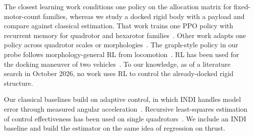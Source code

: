 \documentclass[conference]{IEEEtran}
\begin{document}
The closest learning work conditions one policy on the allocation matrix for fixed-motor-count families, whereas we study a docked rigid body with a payload and compare against classical estimation.
That work trains one PPO policy with recurrent memory for quadrotor and hexarotor families~\cite{konstantaropoulos2026embodiment}.
Other work adapts one policy across quadrotor scales or morphologies~\cite{vaidya2025dynamics,eschmann2025raptor,rehberg2026efficient}.
The graph-style policy in our probe follows morphology-general RL from locomotion~\cite{huang2020one,engwegen2025shared,luo2025gcnt}.
RL has been used for the docking maneuver of two vehicles~\cite{feng2024enhancing}.
To our knowledge, as of a literature search in October 2026, no work uses RL to control the already-docked rigid structure.

Our classical baselines build on adaptive control, in which INDI handles model error through measured angular acceleration~\cite{smeur2016adaptive,smeur2018cascaded,sun2020incremental}.
Recursive least-squares estimation of control effectiveness has been used on single quadrotors~\cite{blaha2024control,blaha2024flying}.
We include an INDI baseline and build the estimator on the same idea of regression on thrust.
\end{document}
